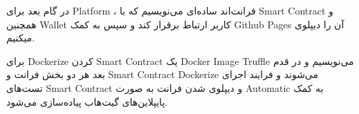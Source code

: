 در گام بعد برای
\gls{Platform}
، فرانت‌اند ساده‌ای می‌نویسیم که با
\gls{Smart Contract}
و همچنین
\gls{Wallet}
کاربر ارتباط برقرار کند و سپس به کمک
\gls{Github Pages}
آن‌ را دیپلوی میکنیم.

برای
\gls{Dockerize}
کردن
\gls{Smart Contract}
یک
\gls{Docker Image}
\gls{Truffle}
می‌نویسیم و در قدم بعد هر دو بخش فرانت و
\gls{Smart Contract}
\gls{Dockerize}
می‌شوند و فرایند اجرای تست‌های
\gls{Smart Contract}
و دیپلوی شدن فرانت به صورت
\gls{Automatic}
به کمک پایپلاین‌های گیت‌هاب پیاده‌سازی می‌شود.
